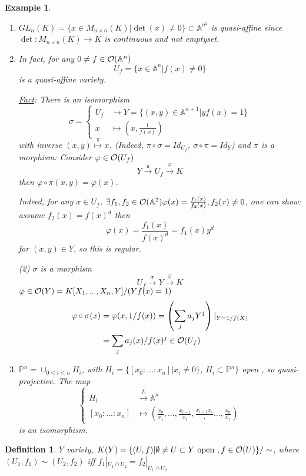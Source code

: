 \documentclass[11pt]{article}
\newtheorem{dfn}[thm]{Definition}
\newtheorem{ex}[thm]{Example}
\newcommand{\affn}{\mathbb A}
\newcommand{\proj}{\mathbb P}
\newcommand{\calo}{{\cal O}}
\newcommand{\lrta}{\longrightarrow}
\begin{document}
\begin{ex}\ 
\begin{enumerate}
\item $GL_n(K)=\{x\in M_{n\times n}(K)|\det(x)\neq 0\}\subset \affn^{n^2}$ is quasi-affine since $\det:M_{n\times n}(K)\lrta K$ is continuous and not emptyset.

\item In fact, for any $0\neq f\in \calo(\affn^n)$
$$
U_f=\{x\in \affn^n|f(x)\neq 0\}
$$
is a quasi-affine variety.

\underline{Fact}: There is an isomorphism
$$
\sigma = 
\left\{\begin{aligned}
U_f&\lrta Y=\{(x,y)\in\affn^{n+1}|yf(x)=1\}\\
x&\longmapsto \left(x,\frac{1}{f(x)}\right)
\end{aligned}
\right.
$$
with inverse
$(x,y)\overset{\pi}{\longmapsto}x$.
(Indeed, $\pi\circ \sigma=Id_{U_f}$, $\sigma\circ \pi=Id_Y$) and $\pi$ is a morphism: Consider $\varphi\in\calo(U_f)$
$$
Y\overset{u}{\lrta}U_f\overset{\varphi}{\lrta}K
$$
then $\varphi\circ \pi(x,y)=\varphi(x)$.

Indeed, for any $x\in U_f$, $\exists f_1,f_2\in \calo(\affn^2)\varphi(x)=\frac{f_1(x)}{f_2(x)}, f_2(x)\neq 0$, one can show: assume $f_2(x)=f(x)^d$ then 
$$
\varphi(x)=\frac{f_1(x)}{f(x)^d}=f_1(x)y^d
$$
for $(x,y)\in Y$, so this is regular.

(2) $\sigma$ is a morphism
$$
U_f\overset{\sigma}{\lrta}Y\overset{\varphi}{\lrta}K
$$
$\varphi\in\calo(Y)=K[X_1,...,X_n,Y]/(Yf(x)=1)$
$$
\begin{aligned}
\varphi\circ \sigma(x)&=\varphi(x,1/f(x))=\left(\sum_j a_j Y^j\right)|_{Y=1/f(X)}\\
&=\sum_j a_j (x)/f(x)^j\in \calo(U_f)
\end{aligned}
$$
\item $\proj^n=\cup_{0\leq i\leq n}H_i$, with $H_i=\{[x_0:...:x_n]|x_{i}\neq 0\}$, $H_i\subset \proj^n\}$ open , so quasi-projective. The map
$$
\left\{\begin{aligned}
H_i&\overset{f_i}{\lrta} \affn^n\\
[x_0:...:x_n]&\longmapsto (\frac{x_0}{x_1},...,\frac{x_{i-1}}{x_i},\frac{x_{i+1}{x_i}},...,\frac{x_n}{x_i})
\end{aligned}
\right.
$$
is an isomorphism.
\end{enumerate}
\end{ex}

\begin{dfn}
$Y$ variety, $K(Y)=\{(U,f)|\emptyset\neq U\subset Y\text{ open },f\in \calo(U)\}/\sim$, where $(U_1,f_1)\sim (U_2,f_2)$ iff $f_1|_{U_1\cap U_2}=f_2|_{U_1\cap U_2}$
\end{dfn}
\end{document}
